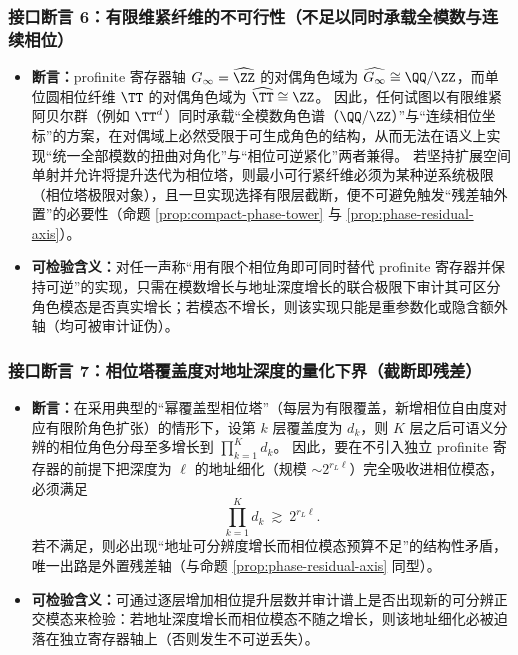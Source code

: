 \subsubsection{接口断言 6：有限维紧纤维的不可行性（不足以同时承载全模数与连续相位）}\label{app:bridgepack-assertion-6}
\begin{itemize}
  \item \textbf{断言：}profinite 寄存器轴 \(G_\infty=\widehat{\ZZ}\) 的对偶角色域为 \(\widehat{G_\infty}\cong\QQ/\ZZ\)，而单位圆相位纤维 \(\TT\) 的对偶角色域为 \(\widehat{\TT}\cong\ZZ\)。
  因此，任何试图以有限维紧阿贝尔群（例如 \(\TT^d\)）同时承载“全模数角色谱（\(\QQ/\ZZ\)）”与“连续相位坐标”的方案，在对偶域上必然受限于可生成角色的结构，从而无法在语义上实现“统一全部模数的扭曲对角化”与“相位可逆紧化”两者兼得。
  若坚持扩展空间单射并允许将提升迭代为相位塔，则最小可行紧纤维必须为某种逆系统极限（相位塔极限对象），且一旦实现选择有限层截断，便不可避免触发“残差轴外置”的必要性（命题 \ref{prop:compact-phase-tower} 与 \ref{prop:phase-residual-axis}）。
  \item \textbf{可检验含义：}对任一声称“用有限个相位角即可同时替代 profinite 寄存器并保持可逆”的实现，只需在模数增长与地址深度增长的联合极限下审计其可区分角色模态是否真实增长；若模态不增长，则该实现只能是重参数化或隐含额外轴（均可被审计证伪）。
\end{itemize}

\subsubsection{接口断言 7：相位塔覆盖度对地址深度的量化下界（截断即残差）}\label{app:bridgepack-assertion-7}
\begin{itemize}
  \item \textbf{断言：}在采用典型的“幂覆盖型相位塔”（每层为有限覆盖，新增相位自由度对应有限阶角色扩张）的情形下，设第 \(k\) 层覆盖度为 \(d_k\)，则 \(K\) 层之后可语义分辨的相位角色分母至多增长到 \(\prod_{k=1}^{K}d_k\)。
  因此，要在不引入独立 profinite 寄存器的前提下把深度为 \(\ell\) 的地址细化（规模 \(\sim 2^{r_L\ell}\)）完全吸收进相位模态，必须满足
  \[
  \prod_{k=1}^{K}d_k\ \gtrsim\ 2^{r_L\ell}.
  \]
  若不满足，则必出现“地址可分辨度增长而相位模态预算不足”的结构性矛盾，唯一出路是外置残差轴（与命题 \ref{prop:phase-residual-axis} 同型）。
  \item \textbf{可检验含义：}可通过逐层增加相位提升层数并审计谱上是否出现新的可分辨正交模态来检验：若地址深度增长而相位模态不随之增长，则该地址细化必被迫落在独立寄存器轴上（否则发生不可逆丢失）。
\end{itemize}

